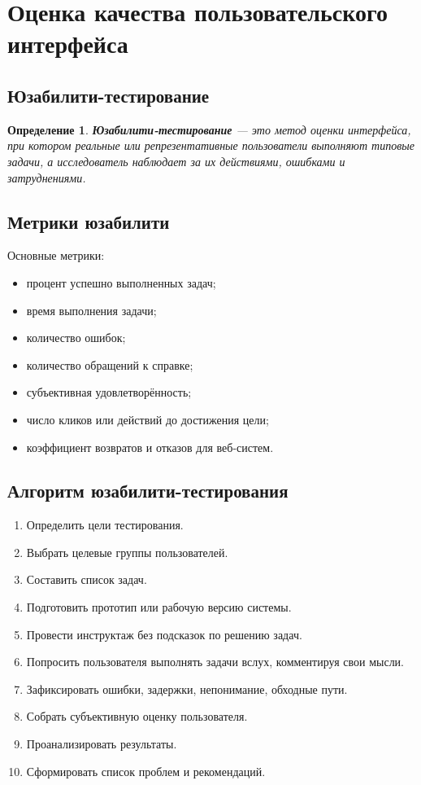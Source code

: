 \documentclass[12pt,a4paper]{article}
\newtheorem{definition}{Определение}
\begin{document}
\section{Оценка качества пользовательского интерфейса}

\subsection{Юзабилити-тестирование}

\begin{definition}
\textbf{Юзабилити-тестирование} --- это метод оценки интерфейса, при котором реальные или репрезентативные пользователи выполняют типовые задачи, а исследователь наблюдает за их действиями, ошибками и затруднениями.
\end{definition}

\subsection{Метрики юзабилити}

Основные метрики:
\begin{itemize}
    \item процент успешно выполненных задач;
    \item время выполнения задачи;
    \item количество ошибок;
    \item количество обращений к справке;
    \item субъективная удовлетворённость;
    \item число кликов или действий до достижения цели;
    \item коэффициент возвратов и отказов для веб-систем.
\end{itemize}

\subsection{Алгоритм юзабилити-тестирования}

\begin{enumerate}
    \item Определить цели тестирования.
    \item Выбрать целевые группы пользователей.
    \item Составить список задач.
    \item Подготовить прототип или рабочую версию системы.
    \item Провести инструктаж без подсказок по решению задач.
    \item Попросить пользователя выполнять задачи вслух, комментируя свои мысли.
    \item Зафиксировать ошибки, задержки, непонимание, обходные пути.
    \item Собрать субъективную оценку пользователя.
    \item Проанализировать результаты.
    \item Сформировать список проблем и рекомендаций.
\end{enumerate}
\end{document}
